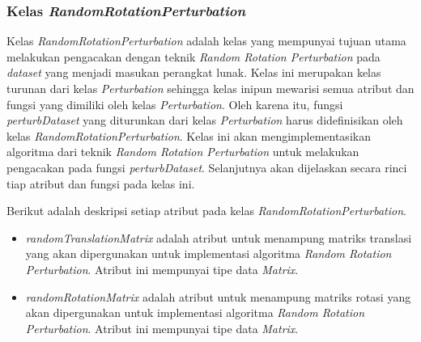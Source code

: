 \subsubsection{Kelas \textit{RandomRotationPerturbation}}
\label{subsubsec:kelas-rrp}

Kelas \textit{RandomRotationPerturbation} adalah kelas yang mempunyai tujuan utama melakukan pengacakan dengan teknik \textit{Random Rotation Perturbation} pada \textit{dataset} yang menjadi masukan perangkat lunak. Kelas ini merupakan kelas turunan dari kelas \textit{Perturbation} sehingga kelas inipun mewarisi semua atribut dan fungsi yang dimiliki oleh kelas \textit{Perturbation}. Oleh karena itu, fungsi \textit{perturbDataset} yang diturunkan dari kelas \textit{Perturbation} harus didefinisikan oleh kelas \textit{RandomRotationPerturbation}. Kelas ini akan mengimplementasikan algoritma dari teknik \textit{Random Rotation Perturbation} untuk melakukan pengacakan pada fungsi \textit{perturbDataset}. Selanjutnya akan dijelaskan secara rinci tiap atribut dan fungsi pada kelas ini.

Berikut adalah deskripsi setiap atribut pada kelas \textit{RandomRotationPerturbation}.
\begin{itemize}
	\item \textit{randomTranslationMatrix} adalah atribut untuk menampung matriks translasi yang akan dipergunakan untuk implementasi algoritma \textit{Random Rotation Perturbation}. Atribut ini mempunyai tipe data \textit{Matrix}.
	\item \textit{randomRotationMatrix} adalah atribut untuk menampung matriks rotasi yang akan dipergunakan untuk implementasi algoritma \textit{Random Rotation Perturbation}. Atribut ini mempunyai tipe data \textit{Matrix}.
\end{itemize}

